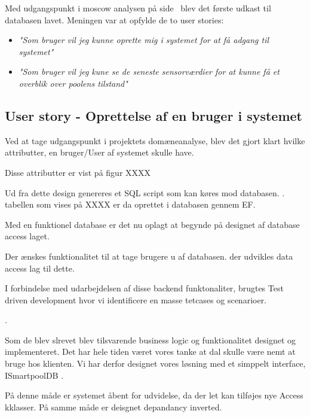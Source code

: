 Med udgangspunkt i \gls{moscow} analysen på side~\pageref{sec:moscow} blev det første udkast til databasen lavet. Meningen var at opfylde de to user stories: 

\begin{itemize}
	\item \textit{"Som bruger vil jeg kunne oprette mig i systemet for at få adgang til systemet"}
	\item \textit{"Som bruger vil jeg kune se de seneste sensorværdier for at kunne få et overblik over poolens tilstand"}
\end{itemize}

\subsection{User story - Oprettelse af en bruger i systemet}

Ved at tage udgangspunkt i projektets domæneanalyse, blev det gjort klart hvilke attributter, en bruger/User af systemet skulle have.

Disse attributter er vist på figur XXXX


Ud fra dette design genereres et SQL script som kan køres mod databasen. . tabellen som vises på XXXX er da oprettet i databasen gennem EF.

Med en funktionel database er det nu oplagt at begynde på designet af database access laget.

Der ænskes funktionalitet til at tage brugere u af databasen. der udvikles data access lag til dette.

I forbindelse med udarbejdelsen af disse backend funktonaliter, brugtes Test driven development hvor vi identificere en masse tetcases og scenarioer.

.

Som de blev slrevet blev tilsvarende business logic og funktionalitet designet og implementeret.
Det har hele tiden været vores tanke at dal skulle være nemt at bruge hos klienten. Vi har derfor designet vores løsning med et simppelt interface, ISmartpoolDB .

På denne måde er systemet åbent for udvidelse, da der let kan tilføjes nye Access kklasser. På samme måde er deisgnet depandancy inverted.

